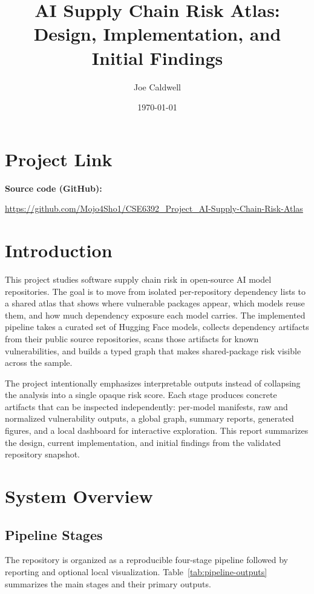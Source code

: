 \documentclass[11pt]{article}
\title{\textbf{AI Supply Chain Risk Atlas:\\Design, Implementation, and Initial Findings}}
\author{Joe Caldwell}
\date{\today}
\begin{document}
\maketitle

\section*{Project Link}
\textbf{Source code (GitHub):}

\url{https://github.com/Mojo4Sho1/CSE6392_Project_AI-Supply-Chain-Risk-Atlas}

\section{Introduction}
This project studies software supply chain risk in open-source AI model repositories. The goal is to move from isolated per-repository dependency lists to a shared atlas that shows where vulnerable packages appear, which models reuse them, and how much dependency exposure each model carries. The implemented pipeline takes a curated set of Hugging Face models, collects dependency artifacts from their public source repositories, scans those artifacts for known vulnerabilities, and builds a typed graph that makes shared-package risk visible across the sample.

The project intentionally emphasizes interpretable outputs instead of collapsing the analysis into a single opaque risk score. Each stage produces concrete artifacts that can be inspected independently: per-model manifests, raw and normalized vulnerability outputs, a global graph, summary reports, generated figures, and a local dashboard for interactive exploration. This report summarizes the design, current implementation, and initial findings from the validated repository snapshot.

\section{System Overview}

\subsection{Pipeline Stages}
The repository is organized as a reproducible four-stage pipeline followed by reporting and optional local visualization. Table~\ref{tab:pipeline-outputs} summarizes the main stages and their primary outputs.
\end{document}
